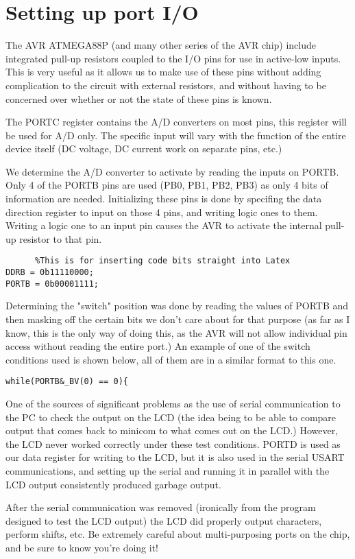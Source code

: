 \section{Setting up port I/O}



The AVR ATMEGA88P (and many other series of the AVR chip) include integrated pull-up resistors coupled to the I/O pins for use in active-low inputs. This is very useful as it allows us to make use of these pins without adding complication to the circuit with external resistors, and without having to be concerned over whether or not the state of these pins is known.

The PORTC register contains the A/D converters on most pins, this register will be used for A/D only. The specific input will vary with the function of the entire device itself (DC voltage, DC current work on separate pins, etc.)

We determine the A/D converter to activate by reading the inputs on PORTB. Only 4 of the PORTB pins are used (PB0, PB1, PB2, PB3) as only 4 bits of information are needed. Initializing these pins is done by specifing the data direction register to input on those 4 pins, and writing logic ones to them. Writing a logic one to an input pin causes the AVR to activate the internal pull-up resistor to that pin.

\begin{lstlisting}		%This is for inserting code bits straight into Latex
DDRB = 0b11110000;
PORTB = 0b00001111;
\end{lstlisting}

Determining the "switch" position was done by reading the values of PORTB and then masking off the certain bits we don't care about for that purpose (as far as I know, this is the only way of doing this, as the AVR will not allow individual pin access without reading the entire port.) An example of one of the switch conditions used is shown below, all of them are in a similar format to this one.

\begin{lstlisting}
while(PORTB&_BV(0) == 0){
\end{lstlisting}

One of the sources of significant problems as the use of serial communication to the PC to check the output on the LCD (the idea being to be able to compare output that comes back to minicom to what comes out on the LCD.) However, the LCD never worked correctly under these test conditions. PORTD is used as our data register for writing to the LCD, but it is also used in the serial USART communications, and setting up the serial and running it in parallel with the LCD output consistently produced garbage output.

After the serial communication was removed (ironically from the program designed to test the LCD output) the LCD did properly output characters, perform shifts, etc. Be extremely careful about multi-purposing ports on the chip, and be sure to know you're doing it!